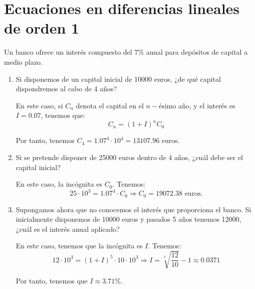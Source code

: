 \section{Ecuaciones en diferencias lineales de orden 1}


\begin{ejercicio} 
Un banco ofrece un interés compuesto del $7\%$ anual para depósitos de capital a medio plazo.
    \begin{enumerate}
        \item Si disponemos de un capital inicial de 10000 euros, ¿de qué capital dispondremos al cabo de 4 años?

        En este caso, si $C_n$ denota el capital en el $n-$ésimo año, y el interés es $I=0.07$, tenemos que:
        \begin{equation*}
            C_n = (1+I)^nC_0
        \end{equation*}

        Por tanto, tenemos $C_4=1.07^4\cdot 10^4=13107.96$ euros.
        
        \item Si se pretende disponer de 25000 euros dentro de 4 años, ¿cuál debe ser el capital inicial?

        En este caso, la incógnita es $C_0$. Tenemos:
        \begin{equation*}
            25\cdot 10^3 = 1.07^4 \cdot C_0 \Longrightarrow C_0 = 19072.38 \text{ euros.}
        \end{equation*}
        
        \item Supongamos ahora que no conocemos el interés que proporciona el banco. Si inicialmente disponemos de 10000 euros y pasados 5 años tenemos 12000, ¿cuál es el interés anual aplicado?

        En este caso, tenemos que la incógnita es $I$. Tenemos:
        \begin{equation*}
            12\cdot 10^3 = (1+I)^5\cdot 10\cdot 10^3 \Longrightarrow I = \sqrt[5]{\frac{12}{10}}-1\approx 0.0371
        \end{equation*}

        Por tanto, tenemos que $I\approx 3.71\%$.
    \end{enumerate}
\end{ejercicio}

